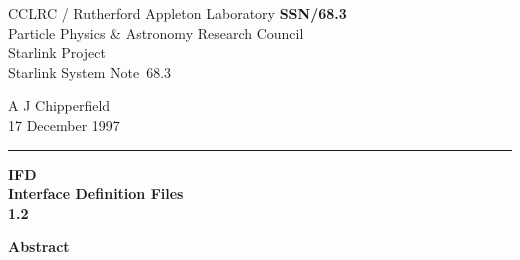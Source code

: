 \documentclass[twoside,11pt]{article}
\newcommand{\stardoccategory}  {Starlink System Note}
\newcommand{\stardocinitials}  {SSN}
\newcommand{\stardocnumber}    {68.3}
\newcommand{\stardocauthors}   {A J Chipperfield}
\newcommand{\stardocdate}      {17 December 1997}
\newcommand{\stardoctitle}     {IFD\\[1ex]
                                Interface Definition Files}
\newcommand{\stardocversion}   {1.2}
\newcommand{\stardocmanual}    {}
\newcommand{\stardocname}{\stardocinitials /\stardocnumber}
\newenvironment{latexonly}{}{}
\begin{document}
\thispagestyle{empty}

\begin{latexonly}
   CCLRC / {\sc Rutherford Appleton Laboratory} \hfill {\bf \stardocname}\\
   {\large Particle Physics \& Astronomy Research Council}\\
   {\large Starlink Project\\}
   {\large \stardoccategory\ \stardocnumber}
   \begin{flushright}
   \stardocauthors\\
   \stardocdate
   \end{flushright}
   \vspace{-4mm}
   \rule{\textwidth}{0.5mm}
   \vspace{5mm}
   \begin{center}
   {\Huge\bf  \stardoctitle \\ [2.5ex]}
   {\LARGE\bf \stardocversion \\ [4ex]}
   {\Huge\bf  \stardocmanual}
   \end{center}
   \vspace{5mm}


   \vspace{10mm}
   \begin{center}
      {\Large\bf Abstract}
   \end{center}
\end{latexonly}
\end{document}
